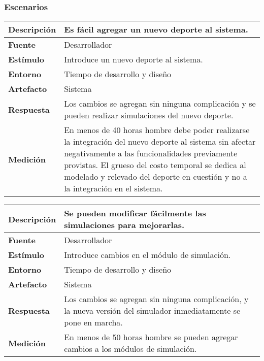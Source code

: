 \subsubsection*{Escenarios}
\begin{center}
  \begin{tabular}{| l | p{10cm} | }
    \hline
	\textbf{Descripción} & Es fácil agregar un nuevo deporte al sistema.\\  \hline
	\textbf{Fuente} & Desarrollador\\  \hline
	\textbf{Estímulo} & Introduce un nuevo deporte al sistema.\\  \hline
	\textbf{Entorno} & Tiempo de desarrollo y diseño\\  \hline
	\textbf{Artefacto} & Sistema\\  \hline
	\textbf{Respuesta} & Los cambios se agregan sin ninguna complicación y se pueden realizar simulaciones del nuevo deporte.\\  \hline
	\textbf{Medición} & En menos de 40 horas hombre debe poder realizarse la integración del nuevo deporte al sistema sin afectar negativamente a las funcionalidades previamente provistas. El grueso del costo temporal se dedica al modelado y relevado del deporte en cuestión y no a la integración en el sistema.\\  \hline
  \end{tabular}
\end{center}

\begin{center}
  \begin{tabular}{| l | p{10cm} | }
    \hline
	\textbf{Descripción} & Se pueden modificar fácilmente las simulaciones para mejorarlas.\\  \hline
	\textbf{Fuente} & Desarrollador\\  \hline
	\textbf{Estímulo} & Introduce cambios en el módulo de simulación.\\  \hline
	\textbf{Entorno} & Tiempo de desarrollo y diseño\\  \hline
	\textbf{Artefacto} & Sistema\\  \hline
	\textbf{Respuesta} & Los cambios se agregan sin ninguna complicación, y la nueva versión del simulador inmediatamente se pone en marcha.\\  \hline
	\textbf{Medición} & En menos de 50 horas hombre se pueden agregar cambios a los módulos de simulación.\\  \hline
  \end{tabular}
\end{center}

